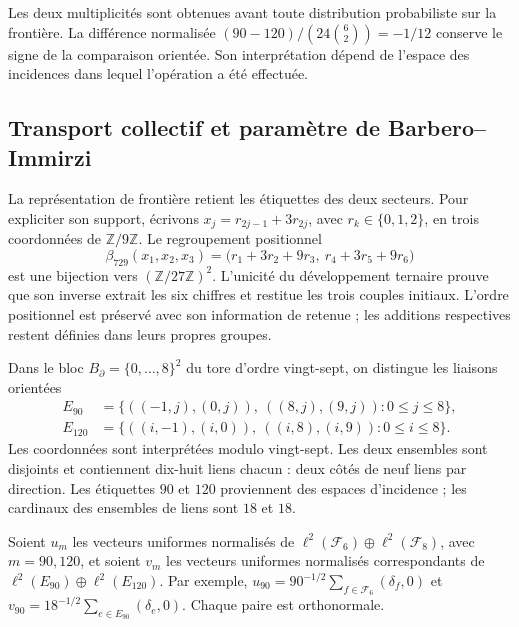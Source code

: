 Les deux multiplicités sont obtenues avant toute distribution
probabiliste sur la frontière. La différence normalisée
\((90-120)/(24\binom62)=-1/12\) conserve le signe de la comparaison
orientée. Son interprétation dépend de l’espace des incidences dans lequel
l’opération a été effectuée.

\subsection{Transport collectif et paramètre de Barbero--Immirzi}

La représentation de frontière retient les étiquettes des deux secteurs. Pour expliciter son support, écrivons \(x_j=r_{2j-1}+3r_{2j}\), avec \(r_k\in\{0,1,2\}\), en trois coordonnées de \(\mathbb Z/9\mathbb Z\). Le regroupement positionnel
\begin{equation}
 \beta_{729}(x_1,x_2,x_3)
 =\bigl(r_1+3r_2+9r_3,\ r_4+3r_5+9r_6\bigr)
 \label{rev4:ae:reagrupamiento}
\end{equation}
est une bijection vers \((\mathbb Z/27\mathbb Z)^2\). L’unicité du
développement ternaire prouve que son inverse extrait les six chiffres et
restitue les trois couples initiaux. L’ordre positionnel est préservé
avec son information de retenue ; les additions respectives restent
définies dans leurs propres groupes.

Dans le bloc \(B_\partial=\{0,\ldots,8\}^2\) du tore d'ordre vingt-sept, on distingue les liaisons orientées
\begin{align}
 E_{90}&=\{((-1,j),(0,j)),\ ((8,j),(9,j)):0\le j\le8\},\\
 E_{120}&=\{((i,-1),(i,0)),\ ((i,8),(i,9)):0\le i\le8\}.
 \label{rev4:ae:enlaces}
\end{align}
Les coordonnées sont interprétées modulo vingt-sept. Les deux ensembles
sont disjoints et contiennent dix-huit liens chacun : deux côtés de
neuf liens par direction. Les étiquettes \(90\) et \(120\) proviennent
des espaces d’incidence ; les cardinaux des ensembles de
liens sont \(18\) et \(18\).

Soient \(u_m\) les vecteurs uniformes normalisés de \(\ell^2(\mathcal F_6)\oplus\ell^2(\mathcal F_8)\), avec \(m=90,120\), et soient \(v_m\) les vecteurs uniformes normalisés correspondants de \(\ell^2(E_{90})\oplus\ell^2(E_{120})\). Par exemple, \(u_{90}=90^{-1/2}\sum_{f\in\mathcal F_6}(\delta_f,0)\) et \(v_{90}=18^{-1/2}\sum_{e\in E_{90}}(\delta_e,0)\). Chaque paire est orthonormale.

